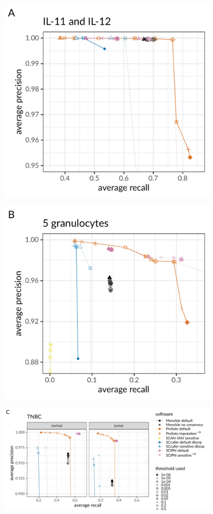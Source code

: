 \documentclass[12pt,inline]{wlscirep}
\begin{document}
\begin{figure}[!tpb]
 \begin{minipage}{.48\linewidth}
  \includegraphics[height=40ex]{figs/Dong2017/Dong2017_prosolo-monovar-scansnv-sccaller_precision-recall-plot_focus-tools.pdf} \\
 \end{minipage}
 \begin{minipage}{.48\linewidth}
  \includegraphics[height=40ex]{figs/Laehnemann2017/Laehnemann2017_prosolo-monovar-scansnv-sccaller-sciphi_precision-recall-plot_focus-top-left.pdf} \\
 \end{minipage}\newline
 \begin{minipage}{.9\linewidth}
  \includegraphics[height=40ex]{figs/Wang2014/Wang2014_prosolo-monovar-scansnv-sccaller-scvilp_precision-recall-plot_focus-tools.pdf} \\
 \end{minipage}


\end{figure}
\end{document}
